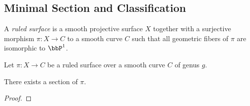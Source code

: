 

\subsection{Minimal Section and Classification}

    \begin{definition}\label{def:ruled_surface}
        A \emph{ruled surface} is a smooth projective surface \(X\) together with a surjective morphism \(\pi:X \to C\) to a smooth curve \(C\) 
        such that all geometric fibers of \(\pi\) are isomorphic to \(\bbP^1\).
    \end{definition}

    Let \(\pi:X \to C\) be a ruled surface over a smooth curve \(C\) of genus \(g\).

    \begin{lemma}\label{lem:existence_of_section_of_ruled_surface}
        There exists a section of \(\pi\).
    \end{lemma}
    \begin{proof}
    \end{proof}


